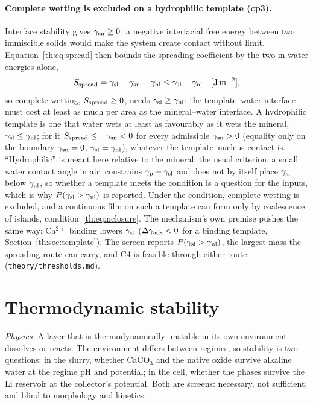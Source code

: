 \paragraph{Complete wetting is excluded on a hydrophilic template (cp3).} Interface stability
gives $\gamma_\mathrm{sn}\ge0$: a negative interfacial free energy between two immiscible solids would make the
system create contact without limit. Equation~\eqref{th:eq:spread} then bounds the spreading
coefficient by the two in-water energies alone,
\begin{equation}\label{th:eq:spread-bound}
S_\mathrm{spread}=\gamma_\mathrm{sl}-\gamma_\mathrm{sn}-\gamma_\mathrm{nl}\le\gamma_\mathrm{sl}-\gamma_\mathrm{nl} \quad[\mathrm{J\,m^{-2}}],
\end{equation}
so complete wetting, $S_\mathrm{spread}\ge0$, needs $\gamma_\mathrm{sl}\ge\gamma_\mathrm{nl}$: the template--water interface must cost at
least as much per area as the mineral--water interface. A hydrophilic template is one that water
wets at least as favourably as it wets the mineral, $\gamma_\mathrm{sl}\le\gamma_\mathrm{nl}$; for it $S_\mathrm{spread}\le-\gamma_\mathrm{sn}<0$ for
every admissible $\gamma_\mathrm{sn}>0$ (equality only on the boundary $\gamma_\mathrm{sn}=0$, $\gamma_\mathrm{sl}=\gamma_\mathrm{nl}$), whatever the
template--nucleus contact is. ``Hydrophilic'' is meant here relative to the mineral; the usual
criterion, a small water contact angle in air, constrains $\gamma_\mathrm{p}-\gamma_\mathrm{sl}$ and does not by itself place
$\gamma_\mathrm{sl}$ below $\gamma_\mathrm{nl}$, so whether a template meets the condition is a question for the inputs, which
is why $P(\gamma_\mathrm{sl}>\gamma_\mathrm{nl})$ is reported. Under the condition, complete wetting is excluded, and a continuous film on such a
template can form only by coalescence of islands, condition~\eqref{th:eq:nclosure}. The
mechanism's own premise pushes the same way: Ca$^{2+}$ binding lowers $\gamma_\mathrm{sl}$ ($\Delta\gamma_\mathrm{ads}<0$ for a
binding template, Section~\ref{th:sec:template}). The screen reports $P(\gamma_\mathrm{sl}>\gamma_\mathrm{nl})$, the largest
mass the spreading route can carry, and C4 is feasible through either route
(\texttt{theory/thresholds.md}).

\section{Thermodynamic stability}\label{th:sec:stability}

\textit{Physics.} A layer that is thermodynamically unstable in its own environment dissolves or
reacts. The environment differs between regimes, so stability is two questions: in the slurry,
whether CaCO$_3$ and the native oxide survive alkaline water at the regime pH and potential; in
the cell, whether the phases survive the Li reservoir at the collector's potential. Both are
screens: necessary, not sufficient, and blind to morphology and kinetics.

